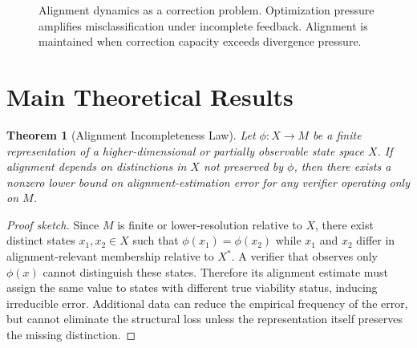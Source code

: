 \documentclass[11pt]{article}
\newtheorem{theorem}{Theorem}
\newcommand{\Xstar}{X^*}
\begin{document}
\begin{figure}[t]
\centering
{}
\caption{Alignment dynamics as a correction problem. Optimization pressure amplifies misclassification under incomplete feedback. Alignment is maintained when correction capacity exceeds divergence pressure.}
\label{fig:alignment-loop}
\end{figure}

\section{Main Theoretical Results}

\begin{theorem}[Alignment Incompleteness Law]
Let $\phi:X\to M$ be a finite representation of a higher-dimensional or partially observable state space $X$. If alignment depends on distinctions in $X$ not preserved by $\phi$, then there exists a nonzero lower bound on alignment-estimation error for any verifier operating only on $M$.
\end{theorem}
\begin{proof}[Proof sketch]
Since $M$ is finite or lower-resolution relative to $X$, there exist distinct states $x_1,x_2\in X$ such that $\phi(x_1)=\phi(x_2)$ while $x_1$ and $x_2$ differ in alignment-relevant membership relative to $\Xstar$. A verifier that observes only $\phi(x)$ cannot distinguish these states. Therefore its alignment estimate must assign the same value to states with different true viability status, inducing irreducible error. Additional data can reduce the empirical frequency of the error, but cannot eliminate the structural loss unless the representation itself preserves the missing distinction.
\end{proof}
\end{document}

